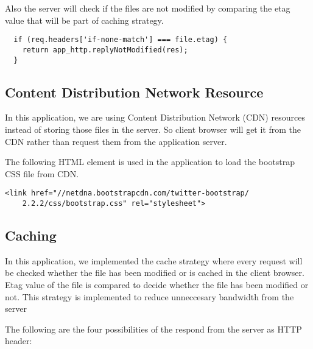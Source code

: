 Also the server will check if the files are not modified by comparing the etag value that will be part of caching strategy.
\begin{lstlisting}
  if (req.headers['if-none-match'] === file.etag) {
    return app_http.replyNotModified(res);
  }
\end{lstlisting}

\subsection{Content Distribution Network Resource}
In this application, we are using Content Distribution Network (CDN) resources instead of storing those files in the server. So client browser will get it from the CDN rather than request them from the application server.  

The following HTML element is used in the application to load the bootstrap CSS file from CDN.
\begin{lstlisting}
<link href="//netdna.bootstrapcdn.com/twitter-bootstrap/
    2.2.2/css/bootstrap.css" rel="stylesheet">
\end{lstlisting}

\subsection{Caching}
In this application, we implemented the cache strategy where every request will be checked whether the file has been modified or is cached in the client browser. Etag value of the file is compared to decide whether the file has been modified or not. This strategy is implemented to reduce unneccesary bandwidth from the server

The following are the four possibilities of the respond from the server as HTTP header:

